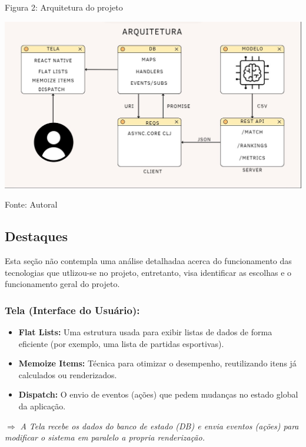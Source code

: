 \documentclass[a4paper,times,12pt]{article}
\begin{document}
\begin{center}
  \caption{Figura 2: Arquitetura do projeto}
  \centering
  \includegraphics[width=16cm]{arquitetura.png}
  \caption{Fonte: Autoral}
  \label{fig:arquitetura}
\end{center}


\subsection{Destaques}
\hspace{+15pt}
Esta seção não contempla uma análise detalhadaa acerca do funcionamento das tecnologias que utlizou-se no projeto, entretanto, visa identificar as escolhas e o funcionamento geral do projeto. 

\subsubsection{Tela (Interface do Usuário):}
\begin{itemize}
  \item \textbf{Flat Lists:} Uma estrutura usada para exibir listas de dados de forma eficiente (por exemplo, uma lista de partidas esportivas).
  \item \textbf{Memoize Items:} Técnica para otimizar o desempenho, reutilizando itens já calculados ou renderizados.
  \item \textbf{Dispatch:} O envio de eventos (ações) que pedem mudanças no estado global da aplicação.
\end{itemize}
\noindent
\(\Rightarrow\) \textit{A Tela recebe os dados do banco de estado (DB) e envia eventos (ações) para modificar o sistema em paralelo a propria renderização.}
\end{document}
